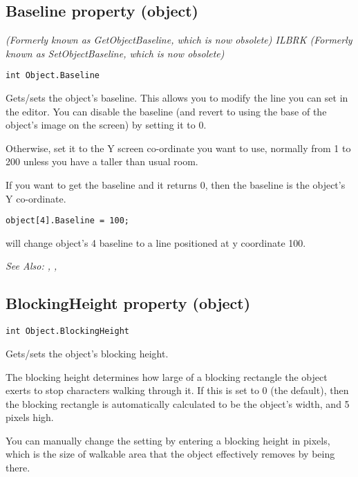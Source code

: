 \subsection{Baseline property (object)}\label{Object.Baseline}%

\it{(Formerly known as GetObjectBaseline, which is now obsolete)} ILBRK
\it{(Formerly known as SetObjectBaseline, which is now obsolete)}

\begin{verbatim}
int Object.Baseline
\end{verbatim}
Gets/sets the object's baseline. This allows you to modify the line you can
set in the editor. You can disable the baseline (and revert to using the
base of the object's image on the screen) by setting it to 0.

Otherwise, set it to the Y screen co-ordinate you want to use,
normally from 1 to 200 unless you have a taller than usual room.

If you want to get the baseline and it returns 0, then the baseline is the
object's Y co-ordinate.

\begin{verbatim}
object[4].Baseline = 100;
\end{verbatim}
will change object's 4 baseline to a line positioned at y coordinate 100.

\it{See Also:} ,
,


\subsection{BlockingHeight property (object)}\label{Object.BlockingHeight}%

\begin{verbatim}
int Object.BlockingHeight
\end{verbatim}
Gets/sets the object's blocking height.

The blocking height determines how large of a blocking rectangle the object exerts to
stop characters walking through it. If this is set to 0 (the default), then the
blocking rectangle is automatically calculated to be the object's width, and 5 pixels
high.

You can manually change the setting by entering a blocking height in pixels, which is the
size of walkable area that the object effectively removes by being there.

